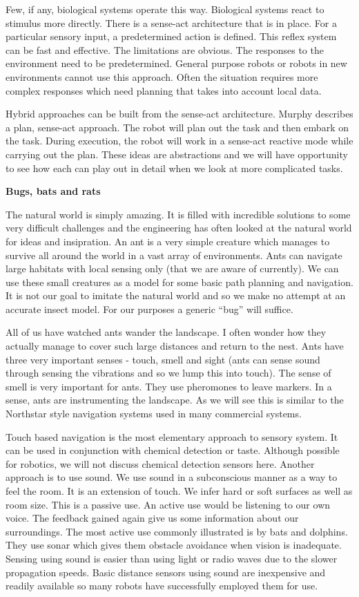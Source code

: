 Few, if any, biological systems operate this way. Biological systems
react to stimulus more directly. There is a sense-act architecture that
is in place. For a particular sensory input, a predetermined action is
defined. This reflex system can be fast and effective. The limitations
are obvious. The responses to the environment need to be predetermined.
General purpose robots or robots in new environments cannot use this
approach. Often the situation requires more complex responses which need
planning that takes into account local data.

Hybrid approaches can be built from the sense-act architecture. Murphy
describes a plan, sense-act approach. The robot will plan out the task
and then embark on the task. During execution, the robot will work in a
sense-act reactive mode while carrying out the plan. These ideas are
abstractions and we will have opportunity to see how each can play out
in detail when we look at more complicated tasks.

\textbf{Bugs, bats and rats}

The natural world is simply amazing. It is filled with incredible
solutions to some very difficult challenges and the engineering has
often looked at the natural world for ideas and insipration. An ant is a
very simple creature which manages to survive all around the world in a
vast array of environments. Ants can navigate large habitats with local
sensing only (that we are aware of currently). We can use these small
creatures as a model for some basic path planning and navigation. It is
not our goal to imitate the natural world and so we make no attempt at
an accurate insect model. For our purposes a generic ``bug'' will
suffice.

All of us have watched ants wander the landscape. I often wonder how
they actually manage to cover such large distances and return to the
nest. Ants have three very important senses - touch, smell and sight
(ants can sense sound through sensing the vibrations and so we lump this
into touch). The sense of smell is very important for ants. They use
pheromones to leave markers. In a sense, ants are instrumenting the
landscape. As we will see this is similar to the Northstar style
navigation systems used in many commercial systems.

Touch based navigation is the most elementary approach to sensory
system. It can be used in conjunction with chemical detection or taste.
Although possible for robotics, we will not discuss chemical detection
sensors here. Another approach is to use sound. We use sound in a
subconscious manner as a way to feel the room. It is an extension of
touch. We infer hard or soft surfaces as well as room size. This is a
passive use. An active use would be listening to our own voice. The
feedback gained again give us some information about our surroundings.
The most active use commonly illustrated is by bats and dolphins. They
use sonar which gives them obstacle avoidance when vision is inadequate.
Sensing using sound is easier than using light or radio waves due to the
slower propagation speeds. Basic distance sensors using sound are
inexpensive and readily available so many robots have successfully
employed them for use.

